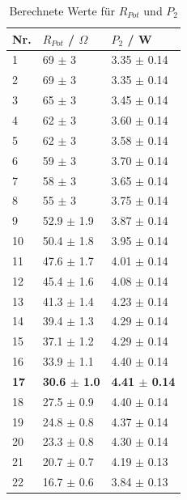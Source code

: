 \documentclass[12pt,a4paper,twoside]{article}
\begin{document}
\begin{table}[H]
    \centering
    \caption{Berechnete Werte für $R_{Pot}$ und $P_{2}$}
    \label{tab:berechnungenRPotP2AW}
    \begin{tabular}{| l | l | l |}
        \hline
        Nr.  & $R_{Pot}$ / $\Omega$ & $P_{2}$ / W \\
        \hline
        1 & 69 $\pm$ 3 & 3.35 $\pm$ 0.14 \\
        2 & 69 $\pm$ 3 & 3.35 $\pm$ 0.14 \\
        3 & 65 $\pm$ 3 & 3.45 $\pm$ 0.14 \\
        4 & 62 $\pm$ 3 & 3.60 $\pm$ 0.14 \\
        5 & 62 $\pm$ 3 & 3.58 $\pm$ 0.14 \\
        6 & 59 $\pm$ 3 & 3.70 $\pm$ 0.14 \\
        7 & 58 $\pm$ 3 & 3.65 $\pm$ 0.14 \\
        8 & 55 $\pm$ 3 & 3.75 $\pm$ 0.14 \\
        9 & 52.9 $\pm$ 1.9 & 3.87 $\pm$ 0.14 \\
        10 & 50.4 $\pm$ 1.8 & 3.95 $\pm$ 0.14 \\
        11 & 47.6 $\pm$ 1.7 & 4.01 $\pm$ 0.14 \\
        12 & 45.4 $\pm$ 1.6 & 4.08 $\pm$ 0.14 \\
        13 & 41.3 $\pm$ 1.4 & 4.23 $\pm$ 0.14 \\
        14 & 39.4 $\pm$ 1.3 & 4.29 $\pm$ 0.14 \\
        15 & 37.1 $\pm$ 1.2 & 4.29 $\pm$ 0.14 \\
        16 & 33.9 $\pm$ 1.1 & 4.40 $\pm$ 0.14 \\
        \textbf{17} & \textbf{30.6 $\pm$ 1.0} & \textbf{4.41 $\pm$ 0.14} \\
        18 & 27.5 $\pm$ 0.9 & 4.40 $\pm$ 0.14 \\
        19 & 24.8 $\pm$ 0.8 & 4.37 $\pm$ 0.14 \\
        20 & 23.3 $\pm$ 0.8 & 4.30 $\pm$ 0.14 \\
        21 & 20.7 $\pm$ 0.7 & 4.19 $\pm$ 0.13 \\
        22 & 16.7 $\pm$ 0.6 & 3.84 $\pm$ 0.13 \\
        \hline
    \end{tabular}
\end{table}
\end{document}
